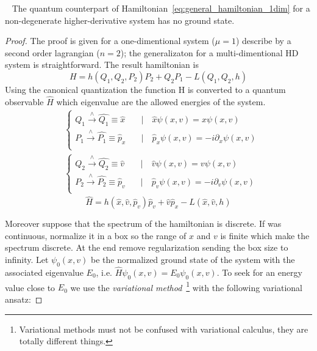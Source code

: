 \begin{theorem}\label{th:ostrogradsky_quantum}~\cite{Smilga17}
  The quantum counterpart of Hamiltonian~\eqref{eq:general_hamiltonian_1dim}
  for a non-degenerate higher-derivative system has no ground state.
\end{theorem}
\begin{proof}
  The proof is given for a one-dimentional system ($\mu=1$) describe by a second
  order lagrangian ($n=2$); the generalizaton for a multi-dimentional HD system
  is straightforward. The result hamiltonian is
  \begin{equation*}
    H = h(Q_1, Q_2, P_2) P_2 + Q_2 P_1 - L(Q_1, Q_2, h)
  \end{equation*}
  Using the canonical quantization the function H is converted to a quantum
  observable $\hat{H}$ which eigenvalue are the allowed energies of the system.
  \begin{align*}
    & \begin{cases}
      Q_1 \xrightarrow{\wedge} \hat{Q_1} \equiv \hat{x}
      \quad &\mid \quad \hat{x}\psi(x, v) = x \psi(x, v) \\
      P_1 \xrightarrow{\wedge} \hat{P_1} \equiv \hat{p}_x
      \quad &\mid \quad \hat{p}_x\psi(x, v) = -i\partial_x \psi(x, v) \\
    \end{cases} \\
    & \begin{cases}
      Q_2 \xrightarrow{\wedge} \hat{Q_2} \equiv \hat{v}
      \quad &\mid \quad \hat{v}\psi(x, v) = v \psi(x, v) \\
      P_2 \xrightarrow{\wedge} \hat{P_2} \equiv \hat{p}_v
      \quad &\mid \quad \hat{p}_v\psi(x, v) = -i\partial_v \psi(x, v) \\
    \end{cases}
  \end{align*}
  \begin{equation} \label{eq:ham_operator_2nd_order}
    \hat{H} = h(\hat{x}, \hat{v}, \hat{p}_v) \hat{p}_v + \hat{v} \hat{p}_x -
    L (\hat{x}, \hat{v}, h)
  \end{equation}

  Moreover suppose that the spectrum of the hamiltonian is discrete. If was
  continuous, normalize it in a box so the range of $x$ and $v$ is finite which
  make the spectrum discrete. At the end remove regularization sending the box
  size to infinity.
  Let $\psi_0(x, v)$ be the normalized ground state of the system with the
  associated eigenvalue $E_0$, i.e. $\hat{H}\psi_0(x, v) = E_0 \psi_0(x, v)$.
  To seek for an energy value close to $E_0$ we use the \emph{variational
  method}~\footnote{
    Variational methods must not be confused with variational calculus, they
    are totally different things.
  } with the following variational ansatz:


\end{proof}
